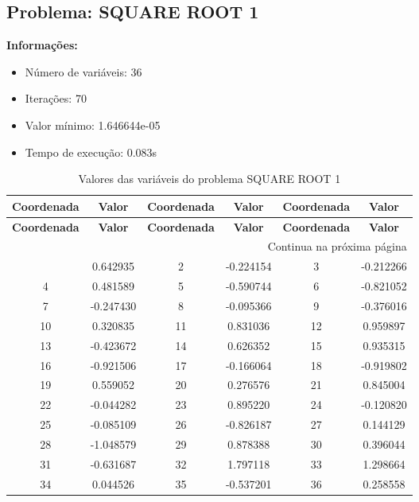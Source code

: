 \documentclass[12pt]{article}
\begin{document}
\newpage            
\subsection{Problema: SQUARE ROOT 1}

\textbf{Informações:}
\begin{itemize}
\item Número de variáveis: 36
\item Iterações: 70
\item Valor mínimo: 1.646644e-05
\item Tempo de execução: 0.083s
\end{itemize}

\small
\begin{longtable}{@{}cc|cc|cc@{}}
\caption{Valores das variáveis do problema SQUARE ROOT 1} \\
\toprule
\textbf{Coordenada} & \textbf{Valor} & \textbf{Coordenada} & \textbf{Valor} & \textbf{Coordenada} & \textbf{Valor} \\
\midrule
\endfirsthead

\toprule
\textbf{Coordenada} & \textbf{Valor} & \textbf{Coordenada} & \textbf{Valor} & \textbf{Coordenada} & \textbf{Valor} \\
\midrule
\endhead

\midrule \multicolumn{6}{r}{{Continua na próxima página}} \\ \midrule
\endfoot

\bottomrule
\endlastfoot
1 & 0.642935 & 2 & -0.224154 & 3 & -0.212266 \\
4 & 0.481589 & 5 & -0.590744 & 6 & -0.821052 \\
7 & -0.247430 & 8 & -0.095366 & 9 & -0.376016 \\
10 & 0.320835 & 11 & 0.831036 & 12 & 0.959897 \\
13 & -0.423672 & 14 & 0.626352 & 15 & 0.935315 \\
16 & -0.921506 & 17 & -0.166064 & 18 & -0.919802 \\
19 & 0.559052 & 20 & 0.276576 & 21 & 0.845004 \\
22 & -0.044282 & 23 & 0.895220 & 24 & -0.120820 \\
25 & -0.085109 & 26 & -0.826187 & 27 & 0.144129 \\
28 & -1.048579 & 29 & 0.878388 & 30 & 0.396044 \\
31 & -0.631687 & 32 & 1.797118 & 33 & 1.298664 \\
34 & 0.044526 & 35 & -0.537201 & 36 & 0.258558 \\

\end{longtable}
\end{document}
